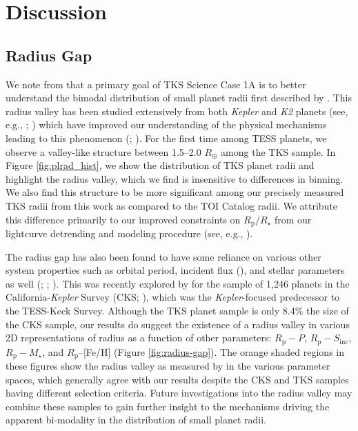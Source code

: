 \documentclass[twocolumn]{aastex63}
\begin{document}
\section{Discussion}
\label{sec:discussion}

\subsection{Radius Gap}
\label{sec:radiusgap}

We note from \cite{Chontos22} that a primary goal of TKS Science Case 1A is to better understand the bimodal distribution of small planet radii first described by \cite{Fulton17}. This radius valley has been studied extensively from both \textit{Kepler} and \textit{K2} planets (see, e.g., \citealt{Berger18}; \citealt{Cloutier20}) which have improved our understanding of the physical mechanisms leading to this phenomenon (\citealt{VE18}; \citealt{Gupta19}). For the first time among TESS planets, we observe a valley-like structure between 1.5--2.0 $R_\oplus$ among the TKS sample. In Figure \ref{fig:plrad_hist}, we show the distribution of TKS planet radii and highlight the radius valley, which we find is insensitive to differences in binning. We also find this structure to be more significant among our precisely measured TKS radii from this work as compared to the TOI Catalog radii. We attribute this difference primarily to our improved constraints on $R_\textrm{p}/R_{\star}$ from our lightcurve detrending and modeling procedure (see, e.g., \citealt{Petigura20}).

The radius gap has also been found to have some reliance on various other system properties such as orbital period, incident flux (\citealt{Cloutier20}), and stellar parameters as well (\citealt{FultonPetigura18}; \citealt{Berger20b}; \citealt{Chen22}). This was recently explored by \citealt{Petigura22} for the sample of 1,246 planets in the California-\textit{Kepler} Survey (CKS; \citealt{Petigura17}), which was the \textit{Kepler}-focused predecessor to the TESS-Keck Survey. Although the TKS planet sample is only 8.4\% the size of the CKS sample, our results do suggest the existence of a radius valley in various 2D representations of radius as a function of other parameters: $R_\textrm{p}-P$, $R_\textrm{p}-S_\textrm{inc}$, $R_\textrm{p}-M_\star$, and $R_\textrm{p}$--[Fe/H] (Figure \ref{fig:radius-gap}). The orange shaded regions in these figures show the radius valley as measured by \cite{Petigura22} in the various parameter spaces, which generally agree with our results despite the CKS and TKS samples having different selection criteria. Future investigations into the radius valley may combine these samples to gain further insight to the mechanisms driving the apparent bi-modality in the distribution of small planet radii.
\end{document}
